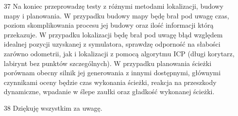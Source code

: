 \documentclass[20pt,a4paper]{article}
\begin{document}
\begin{itemize}
		
		\item[37]
		Na koniec przeprowadzę testy z różnymi metodami lokalizacji, budowy mapy i planowania.
W przypadku budowy mapy będę brał pod uwagę czas, poziom skomplikowania procesu jej budowy oraz ilość informacji którą przekazuje.
W przypadku lokalizacji będę brał pod uwagę błąd względem idealnej pozycji uzyskanej z symulatora, sprawdzę odporność na słabości zarówno odometrii, jak i lokalizacji z pomocą algorytmu ICP (długi korytarz, labirynt bez punktów szczególnych).
W przypadku planowania ścieżki porównam obecny silnik jej generowania z innymi dostępnymi, głównymi czynnikami oceny będzie czas wykonania ścieżki, reakcja na przeszkody dynamiczne, wpadanie w ślepe zaułki oraz gładkość wykonanej ścieżki.
	\item[38]
	Dziękuję wszystkim za uwagę.

\printbibliography
	\end{itemize}
\end{document}
